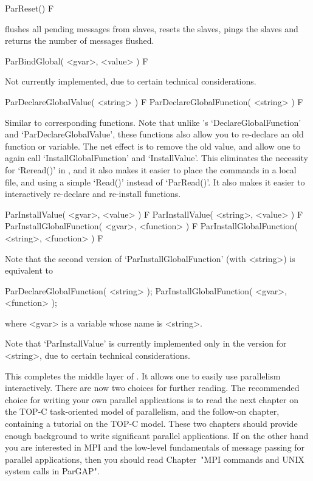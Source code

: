 \>ParReset() F

flushes all pending messages from slaves, resets the  slaves,  pings  the
slaves and returns the number of messages flushed.

\>ParBindGlobal( <gvar>, <value> ) F

Not currently implemented, due to certain technical considerations.

\>ParDeclareGlobalValue( <string> ) F
\>ParDeclareGlobalFunction( <string> ) F

Similar to corresponding {\GAP}  functions.  Note  that  unlike  {\GAP}'s
`DeclareGlobalFunction' and `ParDeclareGlobalValue', these functions also
allow you to re-declare an old function or variable. The net effect is to
remove the old value, and allow one to again call `InstallGlobalFunction'
and `InstallValue'. This  eliminates  the  necessity  for  `Reread()'  in
{\ParGAP}, and it also makes it easier to place the commands in  a  local
file, and using a simple `Read()' instead of `ParRead()'. It  also  makes
it easier to interactively re-declare and re-install functions.

\>ParInstallValue( <gvar>, <value> ) F
\>ParInstallValue( <string>, <value> ) F
\>ParInstallGlobalFunction( <gvar>, <function> ) F
\>ParInstallGlobalFunction( <string>, <function> ) F

Note  that  the  second  version  of   `ParInstallGlobalFunction'   (with
<string>) is equivalent to

ParDeclareGlobalFunction( <string> );
ParInstallGlobalFunction( <gvar>, <function> );

where <gvar> is a {\GAP} variable whose name is <string>.

Note that `ParInstallValue' is currently implemented only in the  version
for <string>, due to certain technical considerations.

This completes the middle layer of {\ParGAP}. It allows one to easily use
parallelism interactively. There are now two choices for further reading.
The recommended choice for writing your own parallel applications  is  to
read the next chapter on the TOP-C task-oriented  model  of  parallelism,
and the follow-on chapter, containing a  tutorial  on  the  TOP-C  model.
These two chapters should provide enough background to write  significant
parallel applications. If on the other hand you are interested in MPI and
the low-level fundamentals of message passing for parallel  applications,
then you should read Chapter~"MPI  commands  and  UNIX  system  calls  in
ParGAP".


